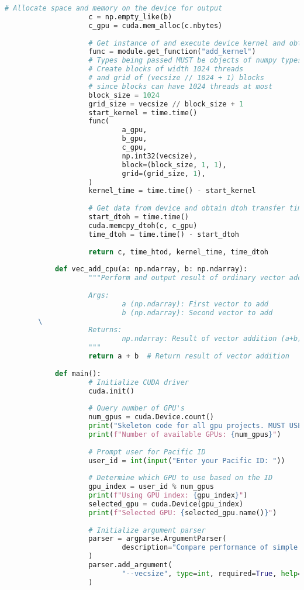 \documentclass[11pt,twoside]{article}
\begin{document}
\begin{enumerate}
\begin{lstlisting}[language=Python,caption={Comparing vector addition using the CPU vs. the GPU with pyCUDA},stepnumber=2]
					# Allocate space and memory on the device for output
					c = np.empty_like(b)
					c_gpu = cuda.mem_alloc(c.nbytes)
			
					# Get instance of and execute device kernel and obtain kernel execution time
					func = module.get_function("add_kernel")
					# Types being passed MUST be objects of numpy types!
					# Create blocks of width 1024 threads
					# and grid of (vecsize // 1024 + 1) blocks
					# since blocks can have 1024 threads at most
					block_size = 1024
					grid_size = vecsize // block_size + 1
					start_kernel = time.time()
					func(
							a_gpu,
							b_gpu,
							c_gpu,
							np.int32(vecsize),
							block=(block_size, 1, 1),
							grid=(grid_size, 1),
					)
					kernel_time = time.time() - start_kernel
			
					# Get data from device and obtain dtoh transfer time
					start_dtoh = time.time()
					cuda.memcpy_dtoh(c, c_gpu)
					time_dtoh = time.time() - start_dtoh
			
					return c, time_htod, kernel_time, time_dtoh
			
			def vec_add_cpu(a: np.ndarray, b: np.ndarray):
					"""Perform and output result of ordinary vector addition on the device CPU.
			
					Args:
							a (np.ndarray): First vector to add
							b (np.ndarray): Second vector to add
		\
					Returns:
							np.ndarray: Result of vector addition (a+b) on the CPU
					"""
					return a + b  # Return result of vector addition
			
			def main():
					# Initialize CUDA driver
					cuda.init()
			
					# Query number of GPU's
					num_gpus = cuda.Device.count()
					print("Skeleton code for all gpu projects. MUST USE IT.")
					print(f"Number of available GPUs: {num_gpus}")
			
					# Prompt user for Pacific ID
					user_id = int(input("Enter your Pacific ID: "))
			
					# Determine which GPU to use based on the ID
					gpu_index = user_id % num_gpus
					print(f"Using GPU index: {gpu_index}")
					selected_gpu = cuda.Device(gpu_index)
					print(f"Selected GPU: {selected_gpu.name()}")
			
					# Initialize argument parser
					parser = argparse.ArgumentParser(
							description="Compare performance of simple vector addition using many parallel CUDA threads on the Nvidia GPU vs. a single thread on the CPU"
					)
					parser.add_argument(
							"--vecsize", type=int, required=True, help="Length of the vectors being added"
					)
			

\end{lstlisting}
\end{enumerate}
\end{document}
